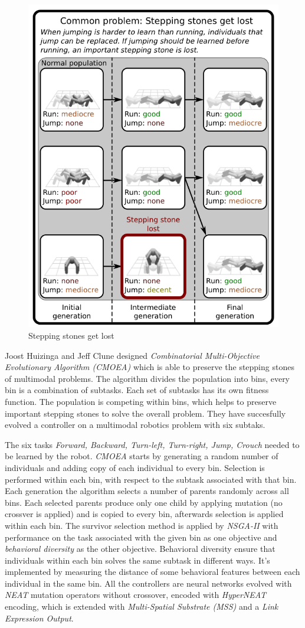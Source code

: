 \documentclass[format=acmsmall, review=false, screen=true]{acmart}
\begin{document}
\begin{figure}[H]
  \includegraphics[width=0.46\linewidth]{img/jumping_running.JPEG}
  \caption{\label{fig:jumping_running}Stepping stones get lost}
\end{figure}

Joost Huizinga and Jeff Clune designed \emph{Combinatorial Multi-Objective Evolutionary Algorithm (CMOEA)} which is able to preserve the stepping stones of multimodal problems. The algorithm divides the population into bins, every bin is a combination of subtasks. Each set of subtasks has its own fitness function. The population is competing within bins, which helps to preserve important stepping stones to solve the overall problem. They have succesfully evolved a controller on a multimodal robotics problem with six subtaks.

The six tasks \emph{Forward, Backward, Turn-left, Turn-right, Jump, Crouch} needed to be learned by the robot. \emph{CMOEA} starts by generating a random number of individuals and adding copy of each individual to every bin. Selection is performed within each bin, with respect to the subtask associated with that bin. Each generation the algorithm selects a number of parents randomly across all bins. Each selected parents produce only one child by applying mutation (no crossver is applied) and is copied to every bin, afterwards selection is applied within each bin. The survivor selection method is applied by \emph{NSGA-II} with performance on the task associated with the given bin as one objective and \emph{behavioral diversity} \cite{behavioraldiversity} as the other objective. Behavioral diversity ensure that individuals within each bin solves the same subtask in different ways. It's implemented by measuring the distance of some behavioral features between each individual in the same bin. All the controllers are neural networks evolved with \emph{NEAT} mutation operators without crossover, encoded with \emph{HyperNEAT}\cite{hyperneat} encoding, which is extended with \emph{Multi-Spatial Substrate (MSS)}\cite{pugh2013evolving} and a \emph{Link Expression Output}\cite{stanley2011constraning}.
\end{document}
